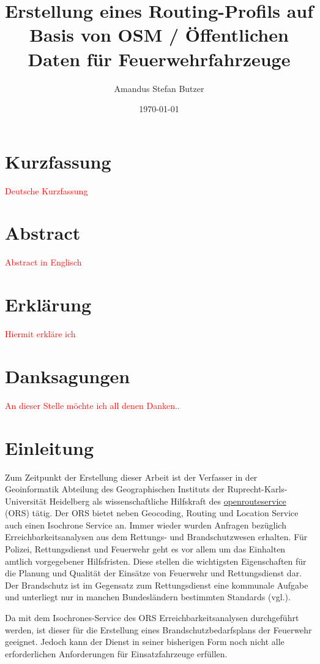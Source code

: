 \documentclass[10pt,a4paper]{article}
\author{Amandus Stefan Butzer}
\title{Erstellung eines Routing-Profils auf Basis von OSM / Öffentlichen Daten für Feuerwehrfahrzeuge}
\date{\today}
\newcommand\todo[1]{\textcolor{red}{#1}}
\begin{document}
\maketitle


\section*{Kurzfassung}
\todo{Deutsche Kurzfassung}

\section*{Abstract}
\todo{Abstract in Englisch}

\section*{Erklärung}
\todo{Hiermit erkläre ich}

\section*{Danksagungen}
\todo{An dieser Stelle möchte ich all denen Danken.. }

\tableofcontents


\section{Einleitung}

Zum Zeitpunkt der Erstellung dieser Arbeit ist der Verfasser in der Geoinformatik Abteilung des Geographischen Instituts der Ruprecht-Karls-Universität Heidelberg als wissenschaftliche Hilfskraft des \href{http://www.openrouteservice.org}{openrouteservice} (ORS) tätig. Der ORS bietet neben Geocoding, Routing und Location Service auch einen Isochrone Service an. Immer wieder wurden Anfragen bezüglich Erreichbarkeitsanalysen aus dem Rettungs- und Brandschutzwesen erhalten. Für Polizei, Rettungsdienst und Feuerwehr geht es vor allem um das Einhalten amtlich vorgegebener Hilfsfristen. Diese stellen die wichtigsten Eigenschaften für die Planung und Qualität der Einsätze von Feuerwehr und Rettungsdienst dar. Der Brandschutz ist im Gegensatz zum Rettungsdienst eine kommunale Aufgabe und unterliegt nur in manchen Bundesländern bestimmten Standards (vgl.\cite{bedarfsplan}).


Da mit dem Isochrones-Service des ORS Erreichbarkeitsanalysen durchgeführt werden, ist dieser für die Erstellung eines Brandschutzbedarfsplans der Feuerwehr geeignet. Jedoch kann der Dienst in seiner bisherigen Form noch nicht alle erforderlichen Anforderungen für Einsatzfahrzeuge erfüllen.
\end{document}
